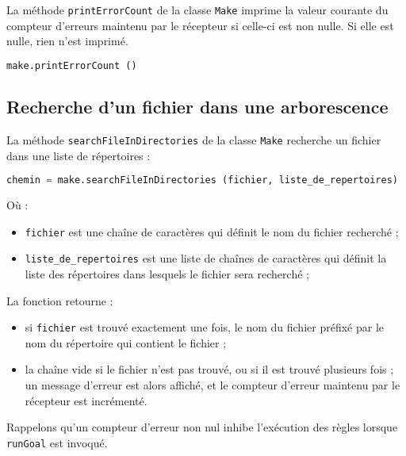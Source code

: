 \documentclass[a4paper,11pt]{extarticle}
\begin{document}
La méthode \texttt{printErrorCount} de la classe \texttt{Make} imprime la valeur courante du compteur d'erreurs maintenu par le récepteur si celle-ci est non nulle. Si elle est nulle, rien n'est imprimé.
\begin{lstlisting}[language=py]
make.printErrorCount ()
\end{lstlisting}


\subsection{Recherche d'un fichier dans une arborescence}

La méthode \texttt{searchFileInDirectories} de la classe \texttt{Make} recherche un fichier dans une liste de répertoires :
\begin{lstlisting}[language=py]
chemin = make.searchFileInDirectories (fichier, liste_de_repertoires)
\end{lstlisting}
Où :
\begin{itemize}
  \item \texttt{fichier} est une chaîne de caractères qui définit le nom du fichier recherché ;
  \item \texttt{liste\_de\_repertoires} est une liste de chaînes de caractères qui définit la liste des répertoires dans lesquels le fichier sera recherché ;
\end{itemize}
La fonction retourne :
\begin{itemize}
  \item si \texttt{fichier} est trouvé exactement une fois, le nom du fichier préfixé par le nom du répertoire qui contient le fichier ;
  \item la chaîne vide si le fichier n'est pas trouvé, ou si il est trouvé plusieurs fois ; un message d'erreur est alors affiché, et le compteur d'erreur maintenu par le récepteur est incrémenté.
\end{itemize}

Rappelons qu'un compteur d'erreur non nul inhibe l'exécution des règles lorsque \texttt{runGoal} est invoqué.


\end{document}
